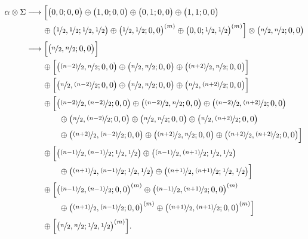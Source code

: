 \documentclass[11pt]{article}
\begin{document}
\begin{equation} \label{eq:scalarsrep}
	\begin{aligned}
		\alpha \otimes \Sigma &\longrightarrow \Big[\big(0,0;0,0\big) \oplus \big(1,0;0,0\big) \oplus \big(0,1;0,0\big) \oplus \big(1,1;0,0\big) \\
		& \qquad \oplus \big(\nicefrac{1}{2},\nicefrac{1}{2};\nicefrac{1}{2},\nicefrac{1}{2}\big) \oplus \big(\nicefrac{1}{2},\nicefrac{1}{2};0,0\big)^{(m)} \oplus \big(0,0;\nicefrac{1}{2},\nicefrac{1}{2}\big)^{(m)}\Big] \otimes \big(\nicefrac{n}{2},\nicefrac{n}{2};0,0\big) \\
		&\longrightarrow \Big[\big(\nicefrac{n}{2},\nicefrac{n}{2};0,0\big)\Big] \\
		&\qquad \oplus \Big[\big(\nicefrac{(n-2)}{2},\nicefrac{n}{2};0,0\big) \oplus \big(\nicefrac{n}{2},\nicefrac{n}{2};0,0\big) \oplus \big(\nicefrac{(n+2)}{2},\nicefrac{n}{2};0,0\big)\Big]\\
		& \qquad\oplus \Big[\big(\nicefrac{n}{2},\nicefrac{(n-2)}{2};0,0\big) \oplus \big(\nicefrac{n}{2},\nicefrac{n}{2};0,0\big) \oplus \big(\nicefrac{n}{2},\nicefrac{(n+2)}{2};0,0\big)\Big] \\
		& \qquad\oplus \Big[\big(\nicefrac{(n-2)}{2},\nicefrac{(n-2)}{2};0,0\big) \oplus \big(\nicefrac{(n-2)}{2},\nicefrac{n}{2};0,0\big) \oplus \big(\nicefrac{(n-2)}{2},\nicefrac{(n+2)}{2};0,0\big) \\
		&\qquad \qquad \oplus \big(\nicefrac{n}{2},\nicefrac{(n-2)}{2};0,0\big) \oplus \big(\nicefrac{n}{2},\nicefrac{n}{2};0,0\big) \oplus \big(\nicefrac{n}{2},\nicefrac{(n+2)}{2};0,0\big) \\
		&\qquad \qquad \oplus \big(\nicefrac{(n+2)}{2},\nicefrac{(n-2)}{2};0,0\big) \oplus \big(\nicefrac{(n+2)}{2},\nicefrac{n}{2};0,0\big) \oplus \big(\nicefrac{(n+2)}{2},\nicefrac{(n+2)}{2};0,0\big)\Big] \\
		& \qquad \oplus \Big[\big(\nicefrac{(n-1)}{2},\nicefrac{(n-1)}{2};\nicefrac{1}{2},\nicefrac{1}{2}\big) \oplus \big(\nicefrac{(n-1)}{2},\nicefrac{(n+1)}{2};\nicefrac{1}{2},\nicefrac{1}{2}\big) \\
		& \qquad \qquad \oplus \big(\nicefrac{(n+1)}{2},\nicefrac{(n-1)}{2};\nicefrac{1}{2},\nicefrac{1}{2}\big) \oplus \big(\nicefrac{(n+1)}{2},\nicefrac{(n+1)}{2};\nicefrac{1}{2},\nicefrac{1}{2}\big)\Big]\\
		& \qquad \oplus \Big[\big(\nicefrac{(n-1)}{2},\nicefrac{(n-1)}{2};0,0\big)^{(m)} \oplus \big(\nicefrac{(n-1)}{2},\nicefrac{(n+1)}{2};0,0\big)^{(m)} \\
		& \qquad \qquad \oplus \big(\nicefrac{(n+1)}{2},\nicefrac{(n-1)}{2};0,0\big)^{(m)} \oplus \big(\nicefrac{(n+1)}{2},\nicefrac{(n+1)}{2};0,0\big)^{(m)}\Big] \\
		& \qquad \oplus \Big[\big(\nicefrac{n}{2},\nicefrac{n}{2};\nicefrac{1}{2},\nicefrac{1}{2}\big)^{(m)}\Big].
	\end{aligned}
\end{equation}
\end{document}

